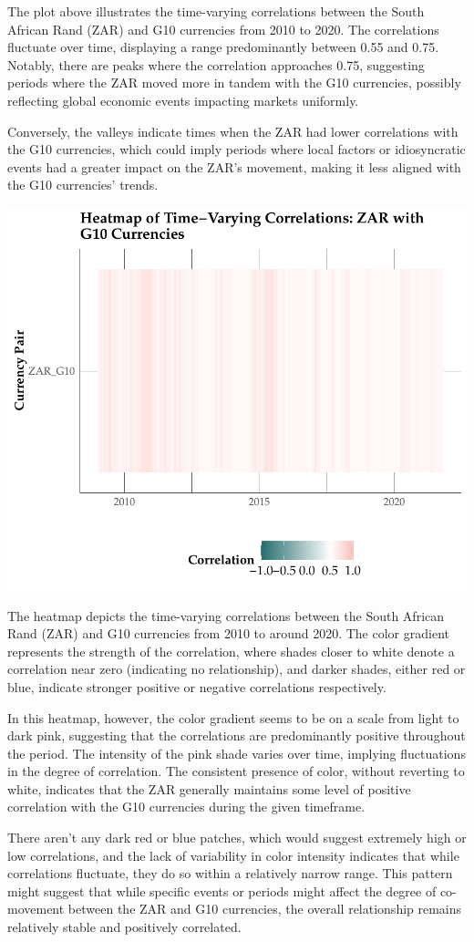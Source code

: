 \documentclass[11pt,preprint, authoryear]{elsarticle}
\numberwithin{equation}{section}
\numberwithin{figure}{section}
\numberwithin{table}{section}
\begin{document}
The plot above illustrates the time-varying correlations between the
South African Rand (ZAR) and G10 currencies from 2010 to 2020. The
correlations fluctuate over time, displaying a range predominantly
between 0.55 and 0.75. Notably, there are peaks where the correlation
approaches 0.75, suggesting periods where the ZAR moved more in tandem
with the G10 currencies, possibly reflecting global economic events
impacting markets uniformly.

Conversely, the valleys indicate times when the ZAR had lower
correlations with the G10 currencies, which could imply periods where
local factors or idiosyncratic events had a greater impact on the ZAR's
movement, making it less aligned with the G10 currencies' trends.

\includegraphics{Question-5_files/figure-latex/heat-map-1.pdf}

The heatmap depicts the time-varying correlations between the South
African Rand (ZAR) and G10 currencies from 2010 to around 2020. The
color gradient represents the strength of the correlation, where shades
closer to white denote a correlation near zero (indicating no
relationship), and darker shades, either red or blue, indicate stronger
positive or negative correlations respectively.

In this heatmap, however, the color gradient seems to be on a scale from
light to dark pink, suggesting that the correlations are predominantly
positive throughout the period. The intensity of the pink shade varies
over time, implying fluctuations in the degree of correlation. The
consistent presence of color, without reverting to white, indicates that
the ZAR generally maintains some level of positive correlation with the
G10 currencies during the given timeframe.

There aren't any dark red or blue patches, which would suggest extremely
high or low correlations, and the lack of variability in color intensity
indicates that while correlations fluctuate, they do so within a
relatively narrow range. This pattern might suggest that while specific
events or periods might affect the degree of co-movement between the ZAR
and G10 currencies, the overall relationship remains relatively stable
and positively correlated.


\end{document}
